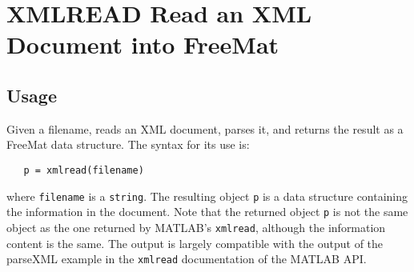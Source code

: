 \section{XMLREAD Read an XML Document into FreeMat}

\subsection{Usage}

Given a filename, reads an XML document, parses it, and
returns the result as a FreeMat data structure.  The syntax for its
use is:
\begin{verbatim}
   p = xmlread(filename)
\end{verbatim}
where \verb|filename| is a \verb|string|.  The
resulting object \verb|p| is a data structure containing the information
in the document.  Note that the returned object \verb|p| is not the same
object as the one returned by MATLAB's \verb|xmlread|, although the 
information content is the same.  The output is largely compatible with the 
output of the parseXML example in the \verb|xmlread| documentation of the
MATLAB API.
